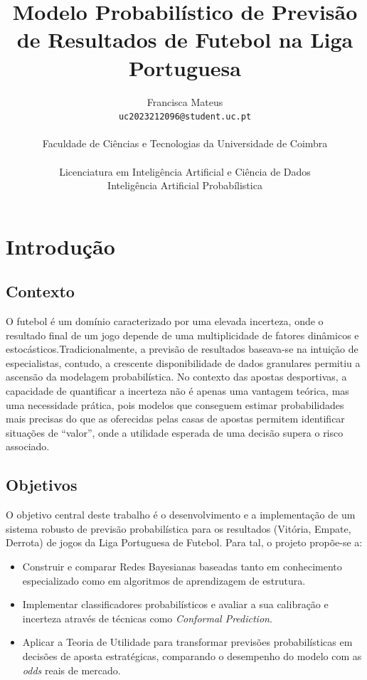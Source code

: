 \documentclass[10pt]{article}
\title{\textbf{Modelo Probabilístico de Previsão de Resultados de Futebol na Liga Portuguesa}}
\author{Francisca Mateus\\
\texttt{uc2023212096@student.uc.pt} \\ \\
Faculdade de Ciências e Tecnologias da Universidade de Coimbra
\\ \\Licenciatura em Inteligência Artificial e Ciência de Dados\\Inteligência Artificial Probabílistica\\ 
}
\date{}
\begin{document}
\maketitle

\section{Introdução}

\subsection{Contexto}
O futebol é um domínio caracterizado por uma elevada incerteza, onde o resultado final de um jogo depende de uma multiplicidade de fatores dinâmicos e estocásticos.Tradicionalmente, a previsão de resultados baseava-se na intuição de especialistas, contudo, a crescente disponibilidade de dados granulares permitiu a ascensão da modelagem probabilística. No contexto das apostas desportivas, a capacidade de quantificar a incerteza não é apenas uma vantagem teórica, mas uma necessidade prática, pois modelos que conseguem estimar probabilidades mais precisas do que as oferecidas pelas casas de apostas permitem identificar situações de ``valor'', onde a utilidade esperada de uma decisão supera o risco associado. 
\subsection{Objetivos}
O objetivo central deste trabalho é o desenvolvimento e a implementação de um sistema robusto de previsão probabilística para os resultados (Vitória, Empate, Derrota) de jogos da Liga Portuguesa de Futebol. Para tal, o projeto propõe-se a:
\begin{itemize}
    \item Construir e comparar Redes Bayesianas baseadas tanto em conhecimento especializado como em algoritmos de aprendizagem de estrutura.
    \item Implementar classificadores probabilísticos e avaliar a sua calibração e incerteza através de técnicas como \textit{Conformal Prediction}.
    \item Aplicar a Teoria de Utilidade para transformar previsões probabilísticas em decisões de aposta estratégicas, comparando o desempenho do modelo com as \textit{odds} reais de mercado.
\end{itemize}
\end{document}
